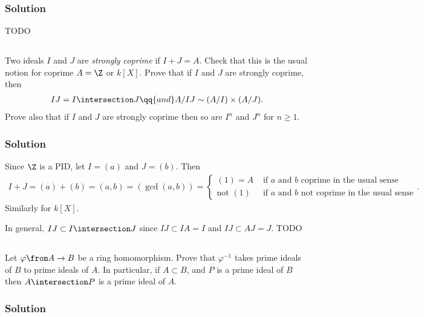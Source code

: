 \subsubsection*{Solution}

TODO


\subsection{}

Two ideals $I$ and $J$ are \emph{strongly coprime} if $I + J = A$. Check that this is the usual notion for coprime $A = \Z$ or $k[X]$. Prove that if $I$ and $J$ are strongly coprime, then
\begin{align}
	I J = I \intersection J \qq{and} A / I J \sim (A / I) \times (A / J).
\end{align}
Prove also that if $I$ and $J$ are strongly coprime then so are $I^n$ and $J^n$ for $n \geq 1$.

\subsubsection*{Solution}

Since $\Z$ is a PID, let $I = (a)$ and $J = (b)$. Then
\begin{align}
	I + J = (a) + (b) = (a, b) = \left( \operatorname{gcd}(a, b) \right) =
	\begin{cases}
		(1) = A &\text{ if $a$ and $b$ coprime in the usual sense}\\
		\text{not } (1) &\text{ if $a$ and $b$ not coprime in the usual sense}
	\end{cases}.
\end{align}
Similarly for $k[X]$.

In general, $I J \subset I \intersection J$ since $I J \subset I A = I$ and $I J \subset A J = J$. TODO


\subsection{}

Let $\varphi \from A \to B$ be a ring homomorphism. Prove that $\varphi^{-1}$ takes prime ideals of $B$ to prime ideals of $A$. In particular, if $A \subset B$, and $P$ is a prime ideal of $B$ then $A \intersection P$ is a prime ideal of $A$.

\subsubsection*{Solution}

